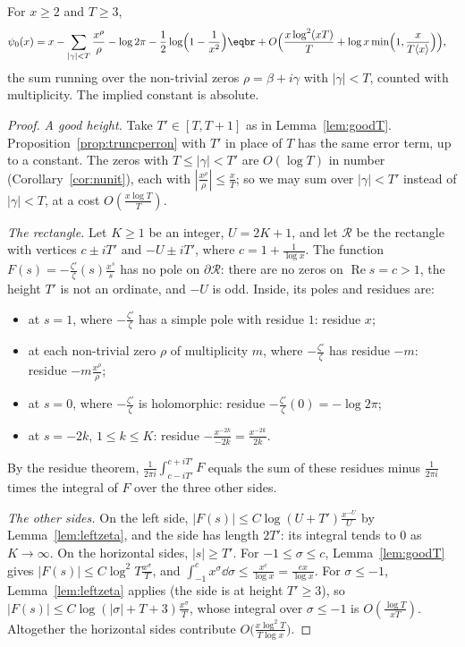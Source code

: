 \begin{theorem}\label{thm:explicit}
For $x\ge2$ and $T\ge3$,
\[
\begin{aligned}\psi_0(x)&=x-\sum_{|\gamma|<T}\frac{x^\rho}\rho-\log2\pi-\frac12\log\Bigl(1-\frac1{x^2}\Bigr)\eqbr+O\Bigl(\frac{x\log^2(xT)}T+\log x\min\Bigl(1,\frac x{T\langle x\rangle}\Bigr)\Bigr),\end{aligned}
\]
the sum running over the non-trivial zeros $\rho=\beta+i\gamma$ with $|\gamma|<T$, counted with multiplicity. The implied constant is absolute.
\end{theorem}
\begin{proof}
\emph{A good height.} Take $T'\in[T,T+1]$ as in Lemma~\ref{lem:goodT}. Proposition~\ref{prop:truncperron} with $T'$ in place of $T$ has the same error term, up to a constant. The zeros with
$T\le|\gamma|<T'$ are $O(\log T)$ in number (Corollary~\ref{cor:nunit}), each with $|\frac{x^\rho}\rho|\le\frac xT$; so we may sum over $|\gamma|<T'$ instead of $|\gamma|<T$, at a cost $O(\frac{x\log T}T)$.

\emph{The rectangle.} Let $K\ge1$ be an integer, $U=2K+1$, and let $\mathcal R$ be the rectangle with vertices $c\pm iT'$ and $-U\pm iT'$, where $c=1+\frac1{\log x}$. The function
$F(s)=-\frac{\zeta'}\zeta(s)\frac{x^s}s$ has no pole on $\partial\mathcal R$: there are no zeros on $\operatorname{Re}s=c>1$, the height $T'$ is not an ordinate, and $-U$ is odd. Inside, its poles and residues are:
\begin{itemize}
\item at $s=1$, where $-\frac{\zeta'}\zeta$ has a simple pole with residue $1$: residue $x$;
\item at each non-trivial zero $\rho$ of multiplicity $m$, where $-\frac{\zeta'}\zeta$ has residue $-m$: residue $-m\frac{x^\rho}\rho$;
\item at $s=0$, where $-\frac{\zeta'}\zeta$ is holomorphic: residue $-\frac{\zeta'}\zeta(0)=-\log2\pi$;
\item at $s=-2k$, $1\le k\le K$: residue $-\frac{x^{-2k}}{-2k}=\frac{x^{-2k}}{2k}$.
\end{itemize}
By the residue theorem, $\frac1{2\pi i}\int_{c-iT'}^{c+iT'}F$ equals the sum of these residues minus $\frac1{2\pi i}$ times the integral of $F$ over the three other sides.

\emph{The other sides.} On the left side, $|F(s)|\le C\log(U+T')\frac{x^{-U}}U$ by Lemma~\ref{lem:leftzeta}, and the side has length $2T'$: its integral tends to $0$ as $K\to\infty$. On the horizontal sides,
$|s|\ge T'$. For $-1\le\sigma\le c$, Lemma~\ref{lem:goodT} gives $|F(s)|\le C\log^2T\frac{x^\sigma}T$, and $\int_{-1}^cx^\sigma\dd\sigma\le\frac{x^c}{\log x}=\frac{ex}{\log x}$. For $\sigma\le-1$,
Lemma~\ref{lem:leftzeta} applies (the side is at height $T'\ge3$), so $|F(s)|\le C\log(|\sigma|+T+3)\frac{x^\sigma}T$, whose integral over $\sigma\le-1$ is $O(\frac{\log T}{xT})$. Altogether the horizontal sides
contribute $O\bigl(\frac{x\log^2T}{T\log x}\bigr)$.


\end{proof}
